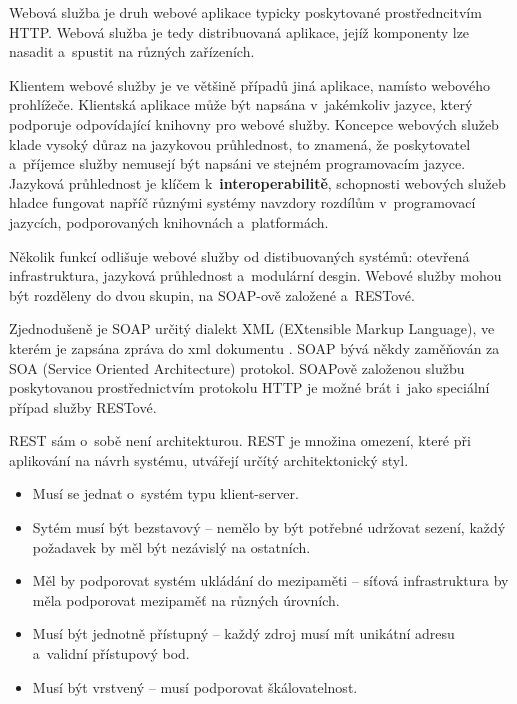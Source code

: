 \documentclass[12pt]{article}
\begin{document}
{

Webová služba
je druh webové aplikace typicky poskytované prostředncitvím HTTP. \cite{kalin}
Webová služba je tedy distribuovaná aplikace, jejíž komponenty lze nasadit a~spustit na různých zařízeních. 

Klientem webové služby je ve většině případů jiná aplikace, namísto webového prohlížeče.
Klientská aplikace může být napsána v~jakémkoliv jazyce, který podporuje
odpovídající knihovny pro webové služby.
Koncepce webových služeb klade vysoký důraz na jazykovou průhlednost, 
to znamená, že poskytovatel a~příjemce služby nemusejí být napsáni
ve stejném programovacím jazyce. 
Jazyková průhlednost je klíčem k~\textbf{interoperabilitě},
schopnosti webových služeb hladce fungovat napříč různými systémy navzdory rozdílům v~programovací jazycích,
podporovaných knihovnách a~platformách.

Několik funkcí odlišuje webové služby od distibuovaných systémů: otevřená infrastruktura,
jazyková průhlednost a~modulární desgin.
Webové služby mohou být rozděleny do dvou skupin, na SOAP-ově založené a~RESTové.


Zjednodušeně je SOAP určitý dialekt XML
(EXtensible Markup Language), ve kterém je zapsána zpráva do xml dokumentu \cite{kalin}.
SOAP bývá někdy zaměňován za SOA (Service Oriented Architecture) protokol.
SOAPově založenou službu poskytovanou prostřednictvím protokolu HTTP je možné brát i~jako speciální případ služby RESTové.


REST sám o~sobě není architekturou. REST je množina omezení,
které při aplikování na návrh systému, utvářejí určítý architektonický styl. 

\bigskip

\begin{itemize}
\item Musí se jednat o~systém typu klient-server.
\item Sytém musí být bezstavový -- nemělo by být potřebné udržovat sezení, každý požadavek by měl být nezávislý na ostatních.
\item Měl by podporovat systém ukládání do mezipaměti -- síťová infrastruktura by měla podporovat mezipaměť na různých úrovních.
\item Musí být jednotně přístupný -- každý zdroj musí mít unikátní adresu a~validní přístupový bod.
\item Musí být vrstvený -- musí podporovat škálovatelnost.
\end{itemize}

}
\end{document}

